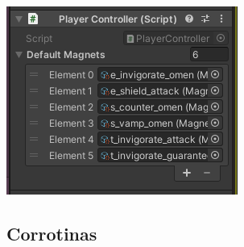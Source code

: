 \documentclass{beamer}
\begin{document}
	\begin{frame}
		\begin{center}
			\includegraphics{so-monobehaviour}
		\end{center}
	\end{frame}

	\subsection{Corrotinas}
\end{document}
